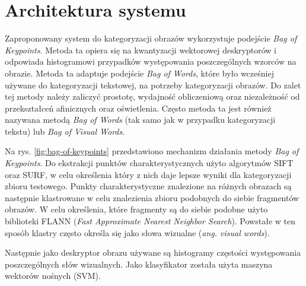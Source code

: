 \section{Architektura systemu}
Zaproponowany system do kategoryzacji obrazów wykorzystuje podejście \emph{Bag of Keypoints}\cite{CSURKA04}. Metoda ta opiera się na kwantyzacji wektorowej deskryptorów i odpowiada histogramowi przypadków występowania poszczególnych wzorców na obrazie. Metoda ta adaptuje podejście \emph{Bag of Words}, które było wcześniej używane do kategoryzacji tekstowej\cite{TONG00}, na potrzeby kategoryzacji obrazów. Do zalet tej metody należy zaliczyć prostotę, wydajność obliczeniową oraz niezależność od przekształceń afinicznych oraz oświetlenia.\cite{CSURKA04} Często metoda ta jest również nazywana metodą \emph{Bag of Words}\cite{TENG11} (tak samo jak w przypadku kategoryzacji tekstu) lub \emph{Bag of Visual Words}\cite{KESORN12}.

Na rys. \ref{fig:bag-of-keypoints} przedstawiono mechanizm działania metody \emph{Bag of Keypoints}. Do ekstrakcji punktów charakterystycznych użyto algorytmów SIFT oraz SURF, w celu określenia który z nich daje lepsze wyniki dla kategoryzacji zbioru testowego. Punkty charakterystyczne znalezione na różnych obrazach są następnie klastrowane w celu znalezienia zbioru podobnych do siebie fragmentów obrazów. W celu określenia, które fragmenty są do siebie podobne użyto biblioteki FLANN (\emph{Fast Approximate Nearest Neighbor Search}). Powstałe w ten sposób klastry często określa się jako słowa wizualne (\emph{ang. visual words}).

Następnie jako deskryptor obrazu używane są histogramy częstości występowania poszczególnych słów wizualnych. Jako klasyfikator została użyta maszyna wektorów nośnych (SVM).

